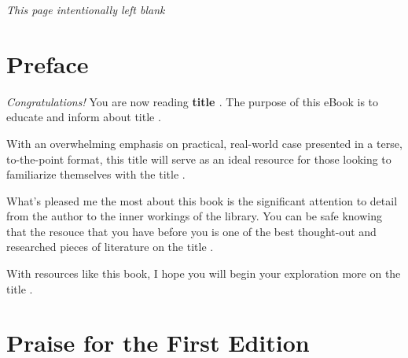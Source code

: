 \documentclass{article}
\begin{document}


\clearpage

\noindent
\begin{center}
{\normalsize \emph{This page intentionally left blank}}
\end{center}

\clearpage

\section*{Preface}
{\normalsize
\begin{flushleft}
\emph{Congratulations!} You are now reading \textbf{ {{ title }} }. The
purpose of this eBook is to educate and inform about {{ title }}.
\end{flushleft}

\begin{flushleft}
With an overwhelming emphasis on practical, real-world case presented
in a terse, to-the-point format, this {{ title }} will serve as an
ideal resource for those looking to familiarize themselves with the 
{{ title }}.
\end{flushleft}

\begin{flushleft}
What's pleased me the most about this book is the significant
attention to detail from the author to the inner workings of the
library. You can be safe knowing that the resouce that you have before
you is one of the best thought-out and researched pieces of literature
on the {{ title }}.
\end{flushleft}

\begin{flushleft}
With resources like this book, I hope you will begin your exploration
more on the {{ title }}.
\end{flushleft}
}

\clearpage

\section*{Praise for the First Edition}
\end{document}
